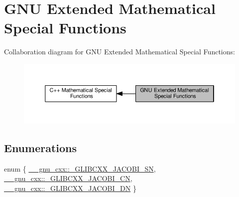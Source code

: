 \hypertarget{group__gnu__math__spec__func}{}\section{G\+NU Extended Mathematical Special Functions}
\label{group__gnu__math__spec__func}
Collaboration diagram for G\+NU Extended Mathematical Special Functions\+:
\nopagebreak
\begin{figure}[H]
\begin{center}
\leavevmode
\includegraphics[width=350pt]{group__gnu__math__spec__func}
\end{center}
\end{figure}
\subsection*{Enumerations}
\begin{DoxyCompactItemize}
\item 
enum \{ \hyperlink{group__gnu__math__spec__func_ggad6c62dd86a596716cece6ac2d4cfd4b3a3f3a4942031777493cbc33f592c941c7}{\+\_\+\+\_\+gnu\+\_\+cxx\+::\+\_\+\+G\+L\+I\+B\+C\+X\+X\+\_\+\+J\+A\+C\+O\+B\+I\+\_\+\+SN}, 
\hyperlink{group__gnu__math__spec__func_ggad6c62dd86a596716cece6ac2d4cfd4b3a86d36c2efbbbfddcfb1e552853d72d65}{\+\_\+\+\_\+gnu\+\_\+cxx\+::\+\_\+\+G\+L\+I\+B\+C\+X\+X\+\_\+\+J\+A\+C\+O\+B\+I\+\_\+\+CN}, 
\hyperlink{group__gnu__math__spec__func_ggad6c62dd86a596716cece6ac2d4cfd4b3a4576182edcbe93595def76dd1e61e0f7}{\+\_\+\+\_\+gnu\+\_\+cxx\+::\+\_\+\+G\+L\+I\+B\+C\+X\+X\+\_\+\+J\+A\+C\+O\+B\+I\+\_\+\+DN}
 \}
\end{DoxyCompactItemize}

